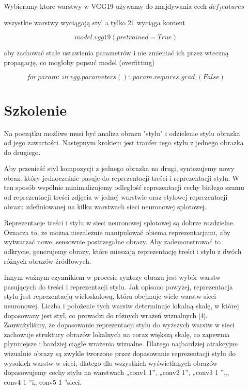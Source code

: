 \documentclass[brudnopis]{xmgr}
\begin{document}
Wybieramy ktore warstwy w VGG19 używamy do znajdywania cech 
$def_features$

wszystkie warstwy wyciągają styl a tylko 21 wyciąga kontent

\begin{equation}
model.vgg19(pretrained=True)
\end{equation}

aby zachować stałe ustawienia parametrów i nie zmieniać ich przez wteczną propagację, co mogłoby popsuć model (overfitting)

\begin{equation}
for\:param:\ in \: vgg.parameters():\:
	param.requires\_grad\_(False)
\end{equation}


\section{Szkolenie\label{s:dsssl}}

Na początku możliwe musi być analiza obrazu "stylu" i odzielenie stylu obrazka od jego zawartości. 
Następnym krokiem jest tranfer tego stylu z jednego obrazka do drugiego.

Aby przenieść styl kompozycji z jednego obrazka na drugi, syntezujemy nowy obraz, który jednocześnie pasuje do reprezentacji treści i reprezentacji stylu. W ten sposób wspólnie minimalizujemy odległość reprezentacji cechy białego szumu od reprezentacji treści zdjęcia w jednej warstwie oraz stylowej reprezentacji obrazu zdefiniowanej na kilku warstwach sieci neuronowej splotowej.

Reprezentacje treści i stylu w sieci neuronowej splotowej są dobrze rozdzielne. Oznacza to, że można niezależnie manipulować obiema reprezentacjami, aby wytwarzać nowe, sensownie postrzegalne obrazy. Aby zademonstrować to odkrycie, generujemy obrazy, które mieszają reprezentację treści i stylu z dwóch różnych obrazów źródłowych.

Innym ważnym czynnikiem w procesie syntezy obrazu jest wybór warstw pasujących do treści i reprezentacji stylu. Jak opisano powyżej, reprezentacja stylu jest reprezentacją wieloskalową, która obejmuje wiele warstw sieci neuronowej. Liczba i położenie tych warstw determinuje lokalną skalę, w której dopasowany jest styl, co prowadzi do różnych wrażeń wizualnych [4]. Zauważyliśmy, że dopasowanie reprezentacji stylu do wyższych warstw w sieci zachowuje struktury obrazów lokalnych na coraz większą skalę, co zapewnia płynniejsze i bardziej ciągłe wrażenia wizualne. Dlatego najbardziej atrakcyjne wizualnie obrazy są zwykle tworzone przez dopasowanie reprezentacji stylu do wysokich warstw w sieci, dlatego dla wszystkich wyświetlanych obrazów dopasowujemy cechy stylu na warstwach „conv1 1”, „conv2 1”, „conv3 1 ”,„ conv4 1 ”i„ conv5 1 ”sieci.
\end{document}
